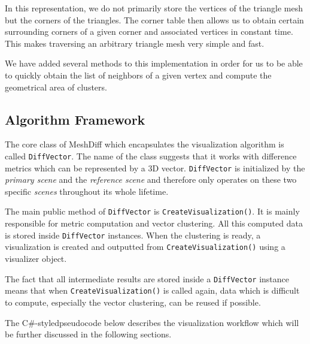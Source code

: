 In this representation, we do not primarily store the vertices of the triangle mesh but the corners of the triangles. The corner table then allows us to obtain certain surrounding corners of a given corner and associated vertices in constant time. This makes traversing an arbitrary triangle mesh very simple and fast.

We have added several methods to this implementation in order for us to be able to quickly obtain the list of neighbors of a given vertex and compute the geometrical area of clusters.

\subsection{Algorithm Framework}
\label{sec:implementation-framework}

The core class of MeshDiff which encapsulates the visualization algorithm is called \verb+DiffVector+. The name of the class suggests that it works with difference metrics which can be represented by a 3D vector. \verb+DiffVector+ is initialized by the {\it primary scene} and the {\it reference scene} and therefore only operates on these two specific {\it scenes} throughout its whole lifetime.

The main public method of \verb+DiffVector+ is \verb+CreateVisualization()+. It is mainly responsible for metric computation and vector clustering. All this computed data is stored inside \verb+DiffVector+ instances. When the clustering is ready, a visualization is created and outputted from \verb+CreateVisualization()+ using a visualizer object.

The fact that all intermediate results are stored inside a \verb+DiffVector+ instance means that when \verb+CreateVisualization()+ is called again, data which is difficult to compute, especially the vector clustering, can be reused if possible.

The C\#-styled\footnotemark pseudocode below describes the visualization workflow which will be further discussed in the following sections.


